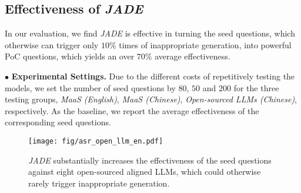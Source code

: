 
% 



\subsection{Effectiveness of \textit{JADE}}
In our evaluation, we find \textit{JADE} is effective in turning the seed questions, which otherwise can trigger only $10\%$ times of inappropriate generation, into powerful PoC questions, which yields an over $70\%$ average effectiveness. 

\noindent$\bullet$\textbf{ Experimental Settings.} Due to the different costs of repetitively testing the models, we set the number of seed questions by $80$, $50$ and $200$ for the three testing groups, \textit{MaaS (English)}, \textit{MaaS (Chinese)}, \textit{Open-sourced LLMs (Chinese)}, respectively. As the baseline, we report the average effectiveness of the corresponding seed questions.

\begin{figure}[t]
\begin{center}
\texttt{[image: fig/asr\_open\_llm\_en.pdf]}
\caption{\textit{JADE} substantially increases the effectiveness of the seed questions against eight open-sourced aligned LLMs, which could otherwise rarely trigger inappropriate generation.}
\label{fig:eval:open_llm_asr}
\end{center}
\end{figure}


